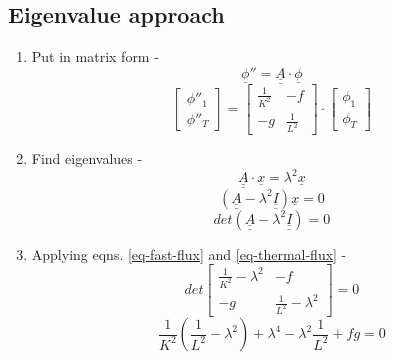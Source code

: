 \documentclass[11pt,a4paper]{article}
\begin{document}
\subsection{Eigenvalue approach}
\begin{enumerate}[leftmargin=*,topsep=0pt]
    \item Put in matrix form -
        \begin{equation}
            \underline{\phi}''=\underline{\underline{A}}\cdot\underline{\phi}
        \end{equation}
        \begin{equation}
            \begin{bmatrix} \phi''_1 \\ \phi''_T \end{bmatrix} = \begin{bmatrix} \frac{1}{K^2} & -f \\ -g & \frac{1}{L^2} \end{bmatrix} \cdot \begin{bmatrix} \phi_1 \\ \phi_T \end{bmatrix}
        \end{equation}
    \item Find eigenvalues - 
        \begin{equation*}
            \underline{\underline{A}}\cdot\underline{x}=\lambda^2\underline{x}
        \end{equation*}
        \begin{equation*}
            (\underline{\underline{A}}-\lambda^2\underline{\underline{I}})\underline{x}=0
        \end{equation*}
        \begin{equation*}
            det(\underline{\underline{A}}-\lambda^2\underline{\underline{I}})=0
        \end{equation*}
    \item Applying eqns. \ref{eq-fast-flux} and \ref{eq-thermal-flux} - 
        \begin{equation}
            det \begin{bmatrix} \frac{1}{K^2}-\lambda^2 & -f \\ -g & \frac{1}{L^2}-\lambda^2 \end{bmatrix} = 0
        \end{equation}
        \begin{equation}
            \frac{1}{K^2}(\frac{1}{L^2}-\lambda^2)+\lambda^4-\lambda^2\frac{1}{L^2}+fg=0
        \end{equation}

\end{enumerate}
\end{document}
